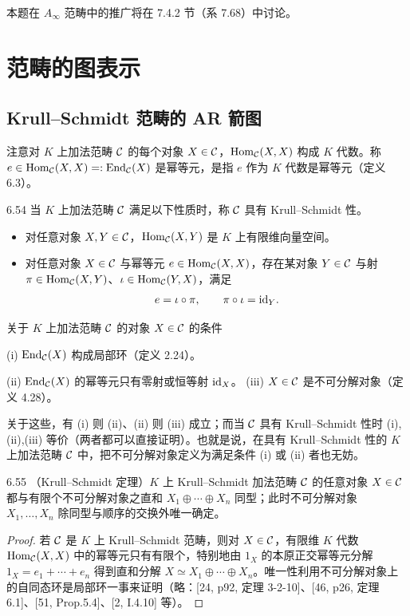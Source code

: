 本题在 $A_\infty$ 范畴中的推广将在 7.4.2 节（系 7.68）中讨论。

\section{范畴的图表示}

\subsection{Krull--Schmidt 范畴的 AR 箭图}

注意对 $K$ 上加法范畴 $\mathcal{C}$ 的每个对象 $X\in\mathcal{C}$，$\operatorname{Hom}_{\mathcal{C}}(X,X)$ 构成 $K$ 代数。称 $e\in\operatorname{Hom}_{\mathcal{C}}(X,X)=:\operatorname{End}_{\mathcal{C}}(X)$ 是幂等元，是指 $e$ 作为 $K$ 代数是幂等元（定义 6.3）。

\begin{definition}{6.54}
当 $K$ 上加法范畴 $\mathcal{C}$ 满足以下性质时，称 $\mathcal{C}$ 具有 Krull--Schmidt 性。
\begin{itemize}[leftmargin=2em,itemsep=1pt,topsep=2pt]
\item[(a)] 对任意对象 $X,Y\in\mathcal{C}$，$\operatorname{Hom}_{\mathcal{C}}(X,Y)$ 是 $K$ 上有限维向量空间。
\item[(b)] 对任意对象 $X\in\mathcal{C}$ 与幂等元 $e\in\operatorname{Hom}_{\mathcal{C}}(X,X)$，存在某对象 $Y\in\mathcal{C}$ 与射 $\pi\in\operatorname{Hom}_{\mathcal{C}}(X,Y)$、$\iota\in\operatorname{Hom}_{\mathcal{C}}(Y,X)$，满足
\[
e=\iota\circ\pi,\qquad \pi\circ\iota=\mathrm{id}_Y.
\]
\end{itemize}
\end{definition}

关于 $K$ 上加法范畴 $\mathcal{C}$ 的对象 $X\in\mathcal{C}$ 的条件

(i) $\operatorname{End}_{\mathcal{C}}(X)$ 构成局部环（定义 2.24）。

(ii) $\operatorname{End}_{\mathcal{C}}(X)$ 的幂等元只有零射或恒等射 $\mathrm{id}_X$。
(iii) $X\in\mathcal{C}$ 是不可分解对象（定义 4.28）。

关于这些，有 (i) 则 (ii)、(ii) 则 (iii) 成立；而当 $\mathcal{C}$ 具有 Krull--Schmidt 性时 (i),(ii),(iii) 等价（两者都可以直接证明）。也就是说，在具有 Krull--Schmidt 性的 $K$ 上加法范畴 $\mathcal{C}$ 中，把不可分解对象定义为满足条件 (i) 或 (ii) 者也无妨。

\begin{theorem}{6.55}
（Krull--Schmidt 定理）$K$ 上 Krull--Schmidt 加法范畴 $\mathcal{C}$ 的任意对象 $X\in\mathcal{C}$ 都与有限个不可分解对象之直和 $X_1\oplus\cdots\oplus X_n$ 同型；此时不可分解对象 $X_1,\dots,X_n$ 除同型与顺序的交换外唯一确定。
\end{theorem}

\begin{proof}
若 $\mathcal{C}$ 是 $K$ 上 Krull--Schmidt 范畴，则对 $X\in\mathcal{C}$，有限维 $K$ 代数 $\operatorname{Hom}_{\mathcal{C}}(X,X)$ 中的幂等元只有有限个，特别地由 $1_X$ 的本原正交幂等元分解 $1_X=e_1+\cdots+e_n$ 得到直和分解 $X\simeq X_1\oplus\cdots\oplus X_n$。唯一性利用不可分解对象上的自同态环是局部环一事来证明（略：[24, p92, 定理 3-2-10]、[46, p26, 定理 6.1]、[51, Prop.5.4]、[2, I.4.10] 等）。
\end{proof}


